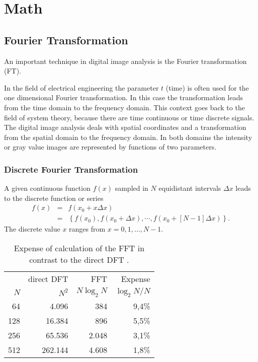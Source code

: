 \chapter{Math}
\label{chap4}
\thispagestyle{empty}

\section{Fourier Transformation}
\label{ft}

An important technique in digital image analysis is the Fourier transformation (FT).

In the field of electrical engineering the parameter $t$ (time) is often used for the one dimensional
Fourier transformation.  In this case the transformation leads from the time domain to the
frequency domain. This context goes back to the field of system theory, because there are
time continuous or time discrete signals. The digital image analysis deals with 
spatial coordinates and a transformation from the spatial domain to the frequency domain.
In both domains the intensity or gray value images are represented 
by functions of two parameters.

\subsection{Discrete Fourier Transformation}
\label{discrete_ft}

A given continuous function $f(x)$ sampled in $N$ equidistant intervals $\Delta x$ 
leads to the discrete function or series 
\begin{eqnarray*}
f(x) &=& f(x_{0}+x \Delta x) \\
 &=& \left \{ f(x_{0}),f(x_{0}+ \Delta x),\cdots,f(x_{0}+ [ N-1 ] \Delta x) \right \}.
\end{eqnarray*}
The discrete value $x$ ranges from
$x=0,1,\dots,N-1$.

\begin{table}
 \begin{center}
 \begin{tabular}{|rrrr|}
 \hline
 & direct DFT & FFT & Expense\\
 $N$ & $N^{2}$ & $N \log_{2} N$ & $\log_{2} N/N$ \\
 \hline
 \hline
  64&      4.096&      384&      9,4\%\\
 128&     16.384&      896&      5,5\%\\
 256&     65.536&    2.048&      3,1\%\\
 512&    262.144&    4.608&      1,8\%\\
 \hline
  \end{tabular}
 \end{center}
 \caption[Expense of calculation of the FFT in contrast to the direct DFT]
   {Expense of calculation of the FFT in contrast to the direct DFT \cite{Gonzalez:1992}.}
 \label{tab_expenseofcalculation}
\end{table}   

